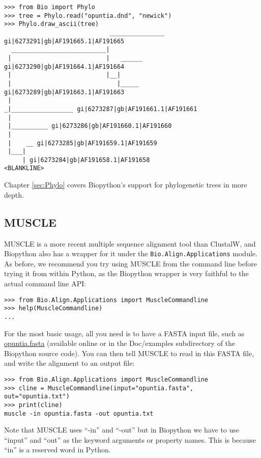 \documentclass{report}
\begin{document}
\begin{verbatim}
>>> from Bio import Phylo
>>> tree = Phylo.read("opuntia.dnd", "newick")
>>> Phylo.draw_ascii(tree)
                             _______________ gi|6273291|gb|AF191665.1|AF191665
  __________________________|
 |                          |   ______ gi|6273290|gb|AF191664.1|AF191664
 |                          |__|
 |                             |_____ gi|6273289|gb|AF191663.1|AF191663
 |
_|_________________ gi|6273287|gb|AF191661.1|AF191661
 |
 |__________ gi|6273286|gb|AF191660.1|AF191660
 |
 |    __ gi|6273285|gb|AF191659.1|AF191659
 |___|
     | gi|6273284|gb|AF191658.1|AF191658
<BLANKLINE>
\end{verbatim}

\noindent Chapter \ref{sec:Phylo} covers Biopython's support for phylogenetic trees in more
depth.

\subsection{MUSCLE}
MUSCLE is a more recent multiple sequence alignment tool than ClustalW, and
Biopython also has a wrapper for it under the \verb|Bio.Align.Applications|
module. As before, we recommend you try using MUSCLE from the command line before
trying it from within Python, as the Biopython wrapper is very faithful to the
actual command line API:

\begin{verbatim}
>>> from Bio.Align.Applications import MuscleCommandline
>>> help(MuscleCommandline)
...
\end{verbatim}

For the most basic usage, all you need is to have a FASTA input file, such as
\href{http://biopython.org/DIST/docs/tutorial/examples/opuntia.fasta}{opuntia.fasta}
(available online or in the Doc/examples subdirectory of the Biopython source
code). You can then tell MUSCLE to read in this FASTA file, and write the
alignment to an output file:

\begin{verbatim}
>>> from Bio.Align.Applications import MuscleCommandline
>>> cline = MuscleCommandline(input="opuntia.fasta", out="opuntia.txt")
>>> print(cline)
muscle -in opuntia.fasta -out opuntia.txt
\end{verbatim}

Note that MUSCLE uses ``-in'' and ``-out'' but in Biopython we have to use
``input'' and ``out'' as the keyword arguments or property names. This is
because ``in'' is a reserved word in Python.
\end{document}
